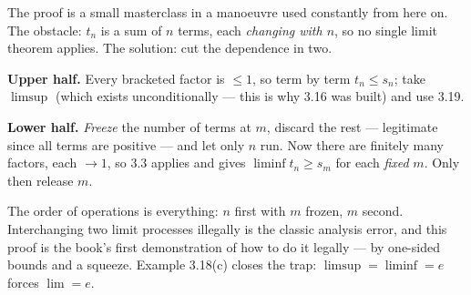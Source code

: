 \begin{center}
\end{center}

\begin{unpack}
The proof is a small masterclass in a manoeuvre used constantly from here on.
The obstacle: $t_n$ is a sum of $n$ terms, each \emph{changing with $n$}, so no
single limit theorem applies. The solution: cut the dependence in two.

\smallskip
\textbf{Upper half.} Every bracketed factor is $\le 1$, so term by term
$t_n \le s_n$; take $\limsup$ (which exists unconditionally --- this is why
3.16 was built) and use 3.19.

\smallskip
\textbf{Lower half.} \emph{Freeze} the number of terms at $m$, discard the
rest --- legitimate since all terms are positive --- and let only $n$ run.
Now there are finitely many factors, each $\to 1$, so 3.3 applies and gives
$\liminf t_n \ge s_m$ for each \emph{fixed} $m$. Only then release $m$.

\smallskip
The order of operations is everything: $n$ first with $m$ frozen, $m$ second.
Interchanging two limit processes illegally is the classic analysis error, and
this proof is the book's first demonstration of how to do it legally --- by
one-sided bounds and a squeeze. Example 3.18(c) closes the trap:
$\limsup = \liminf = e$ forces $\lim = e$.
\end{unpack}

